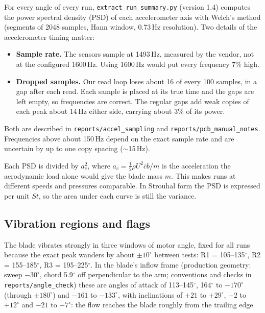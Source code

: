 \documentclass[11pt]{article}
\newcommand{\code}[1]{\texttt{#1}}
\begin{document}
For every angle of every run, \code{extract\_run\_summary.py} (version 1.4)
computes the power spectral density (PSD) of each accelerometer axis with
Welch's method (segments of 2048 samples, Hann window, 0.73\,Hz resolution).
Two details of the accelerometer timing matter:

\begin{itemize}
  \item \textbf{Sample rate.} The sensors sample at 1493\,Hz, measured by the
        vendor, not at the configured 1600\,Hz. Using 1600\,Hz would put every
        frequency 7\% high.
  \item \textbf{Dropped samples.} Our read loop loses about 16 of every 100
        samples, in a gap after each read. Each sample is placed at its true
        time and the gaps are left empty, so frequencies are correct. The
        regular gaps add weak copies of each peak about 14\,Hz either side,
        carrying about 3\% of its power.
\end{itemize}
Both are described in \code{reports/accel\_sampling} and
\code{reports/pcb\_manual\_notes}. Frequencies above about 150\,Hz depend on
the exact sample rate and are uncertain by up to one copy spacing
($\sim$15\,Hz).

Each PSD is divided by $a_c^2$, where $a_c = \tfrac12 \rho U^2 \bar{c} b / m$
is the acceleration the aerodynamic load alone would give the blade mass $m$.
This makes runs at different speeds and pressures comparable. In Strouhal
form the PSD is expressed per unit $St$, so the area under each curve is still
the variance.

\subsection{Vibration regions and flags}
\label{sec:flags}

The blade vibrates strongly in three windows of motor angle, fixed for all
runs because the exact peak wanders by about $\pm10^\circ$ between tests:
R1 = 105--135$^\circ$, R2 = 155--185$^\circ$, R3 = 195--225$^\circ$. In the
blade's inflow frame (production geometry: sweep $-30^\circ$, chord
5.9$^\circ$ off perpendicular to the arm; conventions and checks in
\code{reports/angle\_check}) these are angles of attack of 113--145$^\circ$,
164$^\circ$ to $-170^\circ$ (through $\pm180^\circ$) and $-161$ to
$-133^\circ$, with inclinations of $+21$ to $+29^\circ$, $-2$ to $+12^\circ$
and $-21$ to $-7^\circ$: the flow reaches the blade roughly from the
trailing edge.
\end{document}
